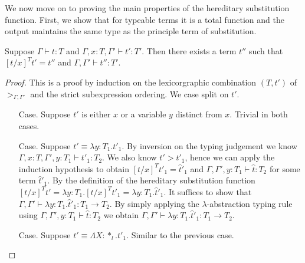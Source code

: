 We now move on to proving the main properties of the hereditary
substitution function.  First, we show that for typeable terms it is a
total function and the output maintains the same type as the principle
term of substitution.
\begin{lemma}
  \label{lemma:total_ssfp}
  Suppose $\Gamma \vdash t : T$ and $\Gamma, x:T, \Gamma' \vdash t':T'$. Then
  there exists a term $t''$ such that $[t/x]^T t' = t''$ and 
  $\Gamma,\Gamma' \vdash t'':T'$.
\end{lemma}
\begin{proof}
  This is a proof by induction on the lexicorgraphic combination
  $(T, t')$ of $>_{\Gamma,\Gamma'}$ and the strict subexpression
  ordering.  We case split on $t'$.

\begin{itemize}
\item[Case.] Suppose $t'$ is either $x$ or a variable $y$ distinct from $x$.  
  Trivial in both cases.
  
\item[Case.] Suppose $t' \equiv \lambda y:T_1.t'_1$.  By inversion on the
  typing judgement we know $\Gamma,x:T,\Gamma',y:T_1 \vdash t'_1:T_2$.
  We also know $t' > t'_1$, hence we can apply the induction hypothesis to obtain
  $[t/x]^T t'_1 = \hat{t}'_1$ and $\Gamma,\Gamma',y:T_1 \vdash \hat{t}:T_2$
  for some term $\hat{t}'_1$.  By the definition of the hereditary substitution function 
  $[t/x]^T t' = \lambda y:T_1.[t/x]^T t'_1 = \lambda y:T_1.\hat{t}'_1$.  It suffices
  to show that $\Gamma,\Gamma' \vdash \lambda y:T_1.\hat{t}'_1:T_1 \to T_2$.  
  By simply applying the $\lambda$-abstraction typing rule using
  $\Gamma,\Gamma',y:T_1 \vdash \hat{t}:T_2$ we obtain 
  $\Gamma,\Gamma' \vdash \lambda y:T_1.\hat{t}'_1:T_1 \to T_2$.
  
\item[Case.] Suppose $t' \equiv \Lambda X:*_l.t'_1$.  Similar to the previous case.
  

\end{itemize}
\end{proof}
